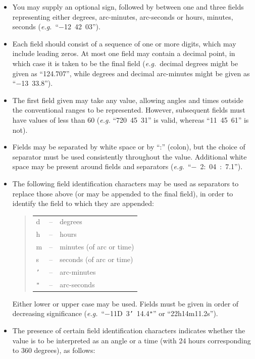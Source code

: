 \documentclass[twoside,11pt]{article}
\begin{document}
\begin{itemize}
\item You may supply an optional sign, followed by between one and
three fields representing either degrees, arc-minutes, arc-seconds or
hours, minutes, seconds ({\em{e.g.}}\ ``$-$12~42~03'').

\item Each field should consist of a sequence of one or more digits,
which may include leading zeros. At most one field may contain a
decimal point, in which case it is taken to be the final field
({\em{e.g.}}\ decimal degrees might be given as ``124.707'', while
degrees and decimal arc-minutes might be given as ``$-$13~33.8'').

\item The first field given may take any value, allowing angles and
times outside the conventional ranges to be represented. However,
subsequent fields must have values of less than 60 ({\em{e.g.}}
``720~45~31'' is valid, whereas ``11~45~61'' is not).

\item Fields may be separated by white space or by ``:'' (colon), but
the choice of separator must be used consistently throughout the
value. Additional white space may be present around fields and
separators ({\em{e.g.}}\ ``$-$~2:~04~:~7.1'').

\item The following field identification characters may be used as
separators to replace those above (or may be appended to the final
field), in order to identify the field to which they are appended:

\begin{quote}
\begin{tabular}{lll}
d & -- & degrees \\
h & -- & hours \\
m & -- & minutes (of arc or time) \\
s & -- & seconds (of arc or time) \\
{\tt{'}} & -- & arc-minutes \\
{\tt{"}} & -- & arc-seconds
\end{tabular}
\end{quote}

Either lower or upper case may be used.  Fields must be given in order
of decreasing significance
({\em{e.g.}}\ ``$-$11D~3{\tt{'}}~14.4{\tt{"}}'' or ``22h14m11.2s'').

\item The presence of certain field identification characters
indicates whether the value is to be interpreted as an angle or a time
(with 24 hours corresponding to 360 degrees), as follows:


\end{itemize}
\end{document}
